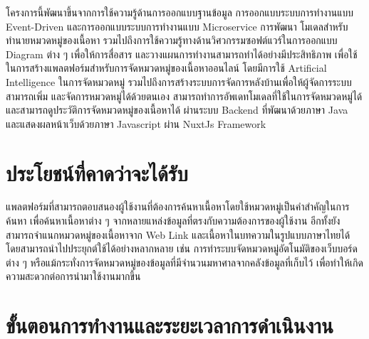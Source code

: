 \documentclass[12pt,oneside,openright,a4paper]{cpe-thai-project}
\begin{document}
  \hspace{1cm}โครงการนี้พัฒนาขึ้นจากการใช้ความรู้ด้านการออกแบบฐานข้อมูล การออกแบบระบบการทำงานแบบ Event-Driven และการออกแบบระบบการทำงานแบบ Microservice การพัฒนา
  โมเดลสำหรับทำนายหมวดหมู่ของเนื้อหา รวมไปถึงการใช้ความรู้ทางด้านวิศวกรรมซอฟต์แวร์ในการออกแบบ Diagram ต่าง ๆ เพื่อให้การสื่อสาร และวางแผนการทำงานสามารถทำได้อย่างมีประสิทธิภาพ
  เพื่อใช้ในการสร้างแพลตฟอร์มสำหรับการจัดหมวดหมู่ของเนื้อหาออนไลน์ โดยมีการใช้ Artificial Intelligence ในการจัดหมวดหมู่ รวมไปถึงการสร้างระบบการจัดการหลังบ้านเพื่อให้ผู้จัดการระบบสามารถเพิ่ม
  และจัดการหมวดหมู่ได้ด้วยตนเอง สามารถทำการอัพเดทโมเดลที่ใช้ในการจัดหมวดหมู่ได้ และสามารถดูประวัติการจัดหมวดหมู่ของเนื้อหาได้ ผ่านระบบ Backend ที่พัฒนาด้วยภาษา Java และแสดงผลหน้าเว็บด้วยภาษา Javascript
  ผ่าน NuxtJs Framework

\section{ประโยชน์ที่คาดว่าจะได้รับ}

  \hspace{1cm}แพลตฟอร์มที่สามารถตอบสนองผู้ใช้งานที่ต้องการค้นหาเนื้อหาโดยใช้หมวดหมู่เป็นคำสำคัญในการค้นหา เพื่อค้นหาเนื้อหาต่าง ๆ จากหลายแหล่งข้อมูลที่ตรงกับความต้องการของผู้ใช้งาน 
  อีกทั้งยังสามารถจำแนกหมวดหมู่ของเนื้อหาจาก Web Link และเนื้อหาในบทความในรูปแบบภาษาไทยได้ โดยสามารถนำไปประยุกต์ใช้ได้อย่างหลากหลาย เช่น 
  การทำระบบจัดหมวดหมู่อัตโนมัติของเว็บบอร์ดต่าง ๆ หรือแม้กระทั่งการจัดหมวดหมู่ของข้อมูลที่มีจำนวนมหาศาลจากคลังข้อมูลที่เก็บไว้ เพื่อทำให้เกิดความสะดวกต่อการนำมาใช้งานมากขึ้น

\section{ขั้นตอนการทํางานและระยะเวลาการดําเนินงาน} 
\end{document}
